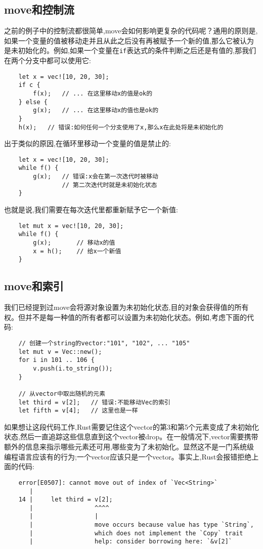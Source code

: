 \subsection{move和控制流}
之前的例子中的控制流都很简单,move会如何影响更复杂的代码呢？通用的原则是,如果一个变量的值被移动走并且从此之后没有再被赋予一个新的值,那么它被认为是未初始化的。例如,如果一个变量在\texttt{if}表达式的条件判断之后还是有值的,那我们在两个分支中都可以使用它:
\begin{verbatim}
    let x = vec![10, 20, 30];
    if c {
        f(x);   // ... 在这里移动x的值是ok的
    } else {
        g(x);   // ... 在这里移动x的值也是ok的
    }
    h(x);   // 错误:如何任何一个分支使用了x,那么x在此处将是未初始化的
\end{verbatim}

出于类似的原因,在循环里移动一个变量的值是禁止的:
\begin{verbatim}
    let x = vec![10, 20, 30];
    while f() {
        g(x);   // 错误:x会在第一次迭代时被移动
                // 第二次迭代时就是未初始化状态 
    }
\end{verbatim}

也就是说,我们需要在每次迭代里都重新赋予它一个新值:
\begin{verbatim}
    let mut x = vec![10, 20, 30];
    while f() {
        g(x);       // 移动x的值
        x = h();    // 给x一个新值
    }
\end{verbatim}

\subsection{move和索引}

我们已经提到过move会将源对象设置为未初始化状态,目的对象会获得值的所有权。但并不是每一种值的所有者都可以设置为未初始化状态。例如,考虑下面的代码:
\begin{verbatim}
    // 创建一个string的vector:"101", "102", ... "105"
    let mut v = Vec::new();
    for i in 101 .. 106 {
        v.push(i.to_string());
    }

    // 从vector中取出随机的元素
    let third = v[2];   // 错误:不能移动Vec的索引
    let fifth = v[4];   // 这里也是一样
\end{verbatim}

如果想让这段代码工作,Rust需要记住这个vector的第3和第5个元素变成了未初始化状态,然后一直追踪这些信息直到这个vector被drop。在一般情况下,vector需要携带额外的信息来指示哪些元素还可用,哪些变为了未初始化。显然这不是一门系统级编程语言应该有的行为;一个vector应该只是一个vector。事实上,Rust会报错拒绝上面的代码:
\begin{verbatim}
    error[E0507]: cannot move out of index of `Vec<String>`
       |
    14 |     let third = v[2];
       |                 ^^^^
       |                 |
       |                 move occurs because value has type `String`,
       |                 which does not implement the `Copy` trait
       |                 help: consider borrowing here: `&v[2]`
\end{verbatim}

